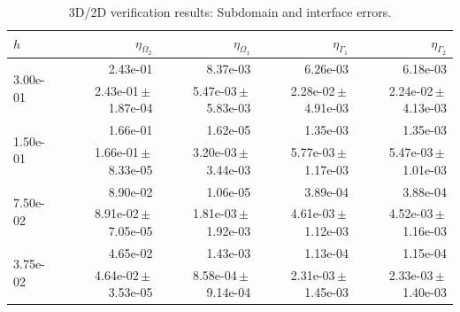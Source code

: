 \begin{table}
\centering
\caption{3D/2D verification results: Subdomain and interface errors.}
\label{tab:verification_local}
\begin{tabular}{lrrrr}
\hline
$h$ & $\eta_{\Omega_2}$ & $\eta_{\Omega_1}$ & $\eta_{\Gamma_1}$ & $\eta_{\Gamma_2}$ \\
\toprule
\multirow{2}{*}{3.00e-01} & 2.43e-01 & 8.37e-03 & 6.26e-03 & 6.18e-03 \\
 & 2.43e-01\,$\pm$\,1.87e-04 & 5.47e-03\,$\pm$\,5.83e-03 & 2.28e-02\,$\pm$\,4.91e-03 & 2.24e-02\,$\pm$\,4.13e-03 \\
\midrule
\multirow{2}{*}{1.50e-01} & 1.66e-01 & 1.62e-05 & 1.35e-03 & 1.35e-03 \\
 & 1.66e-01\,$\pm$\,8.33e-05 & 3.20e-03\,$\pm$\,3.44e-03 & 5.77e-03\,$\pm$\,1.17e-03 & 5.47e-03\,$\pm$\,1.01e-03 \\
\midrule
\multirow{2}{*}{7.50e-02} & 8.90e-02 & 1.06e-05 & 3.89e-04 & 3.88e-04 \\
 & 8.91e-02\,$\pm$\,7.05e-05 & 1.81e-03\,$\pm$\,1.92e-03 & 4.61e-03\,$\pm$\,1.12e-03 & 4.52e-03\,$\pm$\,1.16e-03 \\
\midrule
\multirow{2}{*}{3.75e-02} & 4.65e-02 & 1.43e-03 & 1.13e-04 & 1.15e-04 \\
 & 4.64e-02\,$\pm$\,3.53e-05 & 8.58e-04\,$\pm$\,9.14e-04 & 2.31e-03\,$\pm$\,1.45e-03 & 2.33e-03\,$\pm$\,1.40e-03 \\
\bottomrule
\end{tabular}
\end{table}
